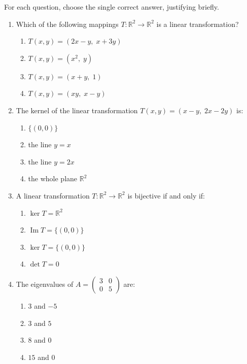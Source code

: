 \documentclass[11pt]{article}
\begin{document}
\begin{exercice}
For each question, choose the single correct answer, justifying briefly.
\begin{enumerate}
\item Which of the following mappings $T:\mathbb{R}^{2}\to\mathbb{R}^{2}$ is a linear transformation?
\begin{enumerate}
\item $T(x,y)=(2x-y,\;x+3y)$
\item $T(x,y)=(x^{2},\;y)$
\item $T(x,y)=(x+y,\;1)$
\item $T(x,y)=(xy,\;x-y)$
\end{enumerate}
\item The kernel of the linear transformation $T(x,y)=(x-y,\;2x-2y)$ is:
\begin{enumerate}
\item $\{(0,0)\}$
\item the line $y=x$
\item the line $y=2x$
\item the whole plane $\mathbb{R}^{2}$
\end{enumerate}
\item A linear transformation $T:\mathbb{R}^{2}\to\mathbb{R}^{2}$ is bijective if and only if:
\begin{enumerate}
\item $\ker T=\mathbb{R}^{2}$
\item $\operatorname{Im} T=\{(0,0)\}$
\item $\ker T=\{(0,0)\}$
\item $\det T=0$
\end{enumerate}
\item The eigenvalues of $A=\begin{pmatrix} 3 & 0 \\ 0 & 5 \end{pmatrix}$ are:
\begin{enumerate}
\item $3$ and $-5$
\item $3$ and $5$
\item $8$ and $0$
\item $15$ and $0$
\end{enumerate}
\end{enumerate}
\end{exercice}
\end{document}
